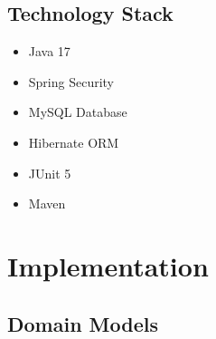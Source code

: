 \documentclass[12pt,a4paper]{report}
\begin{document}
\section{Technology Stack}
\begin{itemize}
    \item Java 17
    \item Spring Security
    \item MySQL Database
    \item Hibernate ORM
    \item JUnit 5
    \item Maven
\end{itemize}

\chapter{Implementation}
\section{Domain Models}
\end{document}
